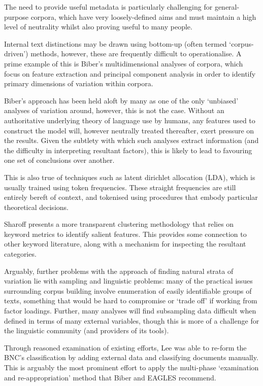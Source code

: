 The need to provide useful metadata is particularly challenging for general-purpose corpora, which have very loosely-defined aims and must maintain a high level of neutrality whilst also proving useful to many people.




Internal text distinctions may be drawn using bottom-up (often termed `corpus-driven') methods, however, these are frequently difficult to operationalise.  A prime example of this is Biber's multidimensional analyses of corpora\cite{biber1992complexity}, which focus on feature extraction and principal component analysis in order to identify primary dimensions of variation within corpora.

Biber's approach has been held aloft by many as one of the only `unbiased' analyses of variation around, however, this is not the case.  Without an authoritative underlying theory of language use by humans, any features used to construct the model will, however neutrally treated thereafter, exert pressure on the results.  Given the subtlety with which such analyses extract information (and the difficulty in interpreting resultant factors), this is likely to lead to favouring one set of conclusions over another.

This is also true of techniques such as latent dirichlet allocation (LDA), which is usually trained using token frequencies.  These straight frequencies are still entirely bereft of context, and tokenised using procedures that embody particular theoretical decisions.

Sharoff\cite{sharoff2007classifying} presents a more transparent clustering methodology that relies on keyword metrics to identify salient features.  This provides some connection to other keyword literature, along with a mechanism for inspecting the resultant categories.

Arguably, further problems with the approach of finding natural strata of variation lie with sampling and linguistic problems: many of the practical issues surrounding corpus building involve enumeration of easily identifiable groups of texts, something that would be hard to compromise or `trade off' if working from factor loadings.  Further, many analyses will find subsampling data difficult when defined in terms of many external variables, though this is more of a challenge for the linguistic community (and providers of its tools).


Through reasoned examination of existing efforts, Lee\cite{lee2003bnc}
was able to re-form the BNC's classification by adding external data and classifying documents manually.  This is arguably the most prominent effort to apply the multi-phase `examination and re-appropriation' method that Biber and EAGLES recommend.

